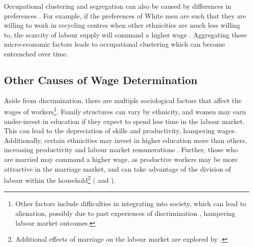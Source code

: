\documentclass[class=article, crop=false]{standalone}
\begin{document}
Occupational clustering and segregation can also be caused by differences in preferences \citep{Thaler}. For example, if the preferences of White men are such that they are willing to work in recycling centres when other ethnicities are much less willing to, the scarcity of labour supply will command a higher wage \citep{Altonji}. Aggregating these micro-economic factors leads to occupational clustering which can become entrenched over time.


\subsection{Other Causes of Wage Determination}
\label{sec:other_causes_of_discrimination}
Aside from discrimination, there are multiple sociological factors that affect the wages of workers\footnote{Other factors include difficulties in integrating into society, which can lead to alienation, possibly due to past experiences of discrimination \citep{Berthoud}, hampering labour market outcomes.}. Family structures can vary by ethnicity, and women may earn under-invest in education if they expect to spend less time in the labour market. This can lead to the depreciation of skills and productivity, hampering wages. Additionally, certain ethnicities may invest in higher education more than others, increasing productivity and labour market remunerations \citep{Becker}. Further, those who are married may command a higher wage, as productive workers may be more attractive in the marriage market, and can take advantage of the division of labour within the household\footnote{Additional effects of marriage on the labour market are explored by \citep{Ahituv}.} (\citet{Nakosteen} and \citet{Bardasi}).
\end{document}

